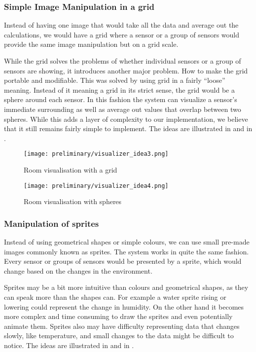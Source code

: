 \documentclass[../document]{subfiles}
\begin{document}
\subsubsection{Simple Image Manipulation in a grid}
Instead of having one image that would take all the data and average out the calculations, we would have a grid where a sensor or a group of sensors would provide the same image manipulation but on a grid scale.

While the grid solves the problems of whether individual sensors or a group of sensors are showing, it introduces another major problem. How to make the grid portable and modifiable. This was solved by using grid in a fairly “loose” meaning. Instead of it meaning a grid in its strict sense, the grid would be a sphere around each sensor. In this fashion the system can visualize a sensor’s immediate surrounding as well as average out values that overlap between two spheres. While this adds a layer of complexity to our implementation, we believe that it still remains fairly simple to implement. The ideas are illustrated in   and in .

\begin{figure}[H]
	\texttt{[image: preliminary/visualizer\_idea3.png]}
	\caption{Room visualisation with a grid}
	\label{fig:visualizer_idea3}
\end{figure}

\begin{figure}[H]
	\texttt{[image: preliminary/visualizer\_idea4.png]}
	\caption{Room visualisation with spheres}
	\label{fig:visualizer_idea4}
\end{figure}

\subsubsection{Manipulation of sprites}
Instead of using geometrical shapes or simple colours, we can use small pre-made images commonly known as sprites. The system works in quite the same fashion. Every sensor or groups of sensors would be presented by a sprite, which would change based on the changes in the environment.

Sprites may be a bit more intuitive than colours and geometrical shapes, as they can speak more than the shapes can. For example a water sprite rising or lowering could represent the change in humidity. On the other hand it becomes more complex and time consuming to draw the sprites and even potentially animate them. Sprites also may have difficulty representing data that changes slowly, like temperature, and small changes to the data might be difficult to notice. The ideas are illustrated in   and in .
\end{document}
